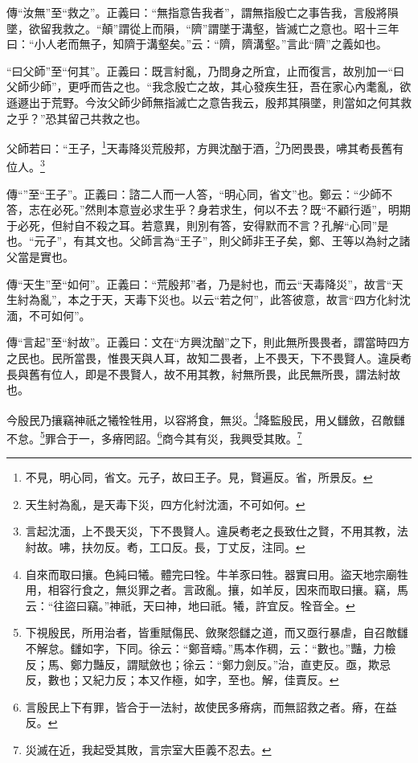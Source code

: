 {\noindent\zhuan{}\fzbyks 傳“汝無”至“救之”。正義曰：“無指意告我者”，謂無指殷亡之事告我，言殷將隕墜，欲留我救之。“顛”謂從上而隕，“隮”謂墜于溝壑，皆滅亡之意也。昭十三年曰：“小人老而無子，知隮于溝壑矣。”云：“隮，隮溝壑。”言此“隮”之義如也。 \par}

{\noindent\shu{}\fzkt “曰父師”至“何其”。正義曰：既言紂亂，乃問身之所宜，止而復言，故別加一“曰父師少師”，更呼而告之也。“我念殷亡之故，其心發疾生狂，吾在家心內耄亂，欲遜遯出于荒野。今汝父師少師無指滅亡之意告我云，殷邦其隕墜，則當如之何其救之乎？”恐其留己共救之也。 \par}

父師若曰：“王子，\footnote{不見，明心同，省文。元子，故曰王子。見，賢遍反。省，所景反。}天毒降災荒殷邦，方興沈酗于酒，\footnote{天生紂為亂，是天毒下災，四方化紂沈湎，不可如何。}乃罔畏畏，咈其耇長舊有位人。\footnote{言起沈湎，上不畏天災，下不畏賢人。違戾耇老之長致仕之賢，不用其教，法紂故。咈，扶勿反。耇，工口反。長，丁丈反，注同。}


{\noindent\zhuan{}\fzbyks 傳“”至“王子”。正義曰：諮二人而一人答，“明心同，省文”也。鄭云：“少師不答，志在必死。”然則本意豈必求生乎？身若求生，何以不去？既“不顧行遁”，明期于必死，但紂自不殺之耳。若意異，則別有答，安得默而不言？孔解“心同”是也。“元子”，有其文也。父師言為“王子”，則父師非王子矣，鄭、王等以為紂之諸父當是實也。 \par}

{\noindent\zhuan{}\fzbyks 傳“天生”至“如何”。正義曰：“荒殷邦”者，乃是紂也，而云“天毒降災”，故言“天生紂為亂”，本之于天，天毒下災也。以云“若之何”，此答彼意，故言“四方化紂沈湎，不可如何”。 \par}

{\noindent\zhuan{}\fzbyks 傳“言起”至“紂故”。正義曰：文在“方興沈酗”之下，則此無所畏畏者，謂當時四方之民也。民所當畏，惟畏天與人耳，故知二畏者，上不畏天，下不畏賢人。違戾耇長與舊有位人，即是不畏賢人，故不用其教，紂無所畏，此民無所畏，謂法紂故也。 \par}

今殷民乃攘竊神祇之犧牷牲用，以容將食，無災。\footnote{自來而取曰攘。色純曰犧。體完曰牷。牛羊豕曰牲。器實曰用。盜天地宗廟牲用，相容行食之，無災罪之者。言政亂。攘，如羊反，因來而取曰攘。竊，馬云：“往盜曰竊。”神祇，天曰神，地曰祇。犧，許宜反。牷音全。}降監殷民，用乂讎斂，召敵讎不怠。\footnote{下視殷民，所用治者，皆重賦傷民、斂聚怨讎之道，而又亟行暴虐，自召敵讎不解怠。讎如字，下同。徐云：“鄭音疇。”馬本作稠，云：“數也。”豔，力檢反；馬、鄭力豔反，謂賦斂也；徐云：“鄭力劍反。”治，直吏反。亟，欺忌反，數也；又紀力反；本又作極，如字，至也。解，佳賣反。}罪合于一，多瘠罔詔。\footnote{言殷民上下有罪，皆合于一法紂，故使民多瘠病，而無詔救之者。瘠，在益反。}商今其有災，我興受其敗。\footnote{災滅在近，我起受其敗，言宗室大臣義不忍去。}


